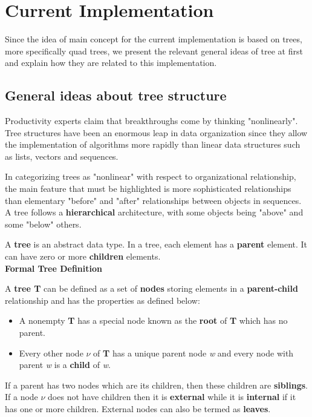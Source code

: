 \chapter{Current Implementation}
\label{chapter:myImplementation}

Since the idea of main concept for the current implementation is based on trees, more specifically quad trees, we present the relevant general ideas of tree at first and explain how they are related to this implementation.

 \section{General ideas about tree structure}
 
 		
		Productivity experts claim that breakthroughs come by thinking "nonlinearly". Tree structures have been an enormous leap in data organization since they allow the implementation of algorithms more rapidly than linear data structures such as lists, vectors and sequences.
		
		In categorizing trees as "nonlinear" with respect to organizational relationship, the main feature that must be highlighted is more sophisticated relationships than elementary "before" and "after" relationships between objects in sequences. A tree follows a \textbf{hierarchical} architecture, with some objects being "above" and some "below" others.
		
		A \textbf{tree} is an abstract data type. In a tree, each element has a \textbf{parent} element. It can have zero or more \textbf{children} elements.
		\\
		\textbf{Formal Tree Definition}
		
		A \textbf{tree T} can be defined as a set of \textbf{nodes} storing elements in a \textbf{parent-child} relationship and has the properties as defined below:
		\begin{itemize}
			\item A nonempty \textbf{T} has a special node known as the \textbf{root} of \textbf{T} which has no parent. 
			\item Every other node \textit{$\nu$} of \textbf{T} has a unique parent node \textit{w} and every node with parent \textit{w} is a \textbf{child} of \textit{w}.
		\end{itemize}

		If a parent has two nodes which are its children, then these children are \textbf{siblings}. If a node \textit{$\nu$} does not have children then it is \textbf{external} while it is \textbf{internal} if it has one or more children. External nodes can also be termed as \textbf{leaves}.
		
